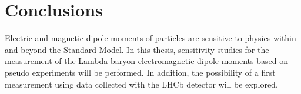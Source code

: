 \chapter*{Conclusions}

Electric and magnetic dipole moments of particles are sensitive to physics within and beyond the Standard Model. In this thesis, sensitivity studies for the measurement of the Lambda baryon electromagnetic dipole moments based on pseudo experiments will be performed. In addition, the possibility of a first measurement using data collected with the LHCb detector will be explored. 
